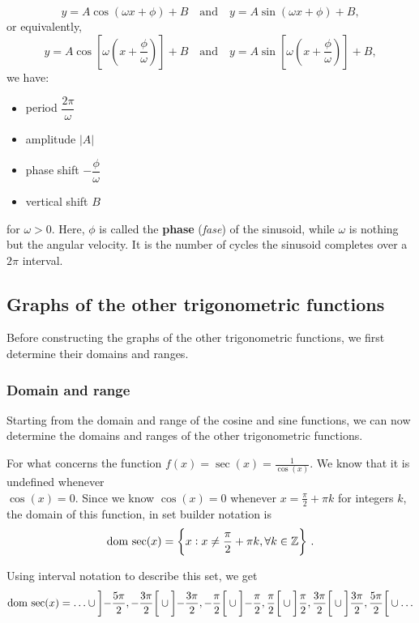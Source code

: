 \[y = A \cos(\omega x + \phi) + B \quad \text{and} \quad y= A \sin(\omega x + \phi) + B ,\]
or equivalently,
\[y = A \cos\left[\omega \left(x + \frac{\phi}{\omega}\right)\right] + B \quad \text{and} \quad y= A \sin\left[\omega \left(x + \frac{\phi}{\omega}\right)\right] + B ,\]
we have:
\begin{itemize}

\item   period $\dfrac{2\pi}{\omega}$

\item   amplitude $|A|$

\item   phase shift $-\dfrac{\phi}{\omega}$

\item   vertical shift $B$

\end{itemize}
for $\omega>0$. Here, $\phi$ is called the \textbf{phase} (\textit{fase}) of the sinusoid, while $\omega$ is nothing but the angular velocity.  It is the number of cycles the sinusoid completes over a $2\pi$ interval. 

\fi


\subsection{Graphs of the other trigonometric functions}

Before constructing the graphs of the other trigonometric functions, we first determine their domains and ranges. 

\subsubsection{Domain and range}
Starting from the domain and range of the cosine and sine functions, we can now determine the domains and ranges of the other trigonometric functions. 

For what concerns the function $f(x) = \sec(x) = \frac{1}{\cos(x)}$.  We know that it is undefined whenever \\ $\cos(x) = 0$.  Since we know $\cos(x) = 0$ whenever $x = \frac{\pi}{2} + \pi k$ for integers $k$, the domain of this function, in set builder notation is  
$$\text{dom}{\,}\sec(x)=\left\{ x : x \neq  \frac{\pi}{2} + \pi k, \forall k \in\mathbb{Z} \right\}\,.$$

Using interval notation to describe this set, we get  
\[\text{dom}{\,}
\sec(x) = \ldots \cup \left] -\frac{5\pi}{2}, -\frac{3\pi}{2}\right[ \cup \left] -\frac{3\pi}{2}, -\frac{\pi}{2}\right[ \cup  \left]-\frac{\pi}{2}, \frac{\pi}{2}\right[ \cup \left]\frac{\pi}{2}, \frac{3\pi}{2}\right[ \cup  \left]\frac{3\pi}{2}, \frac{5\pi}{2}\right[ \cup \ldots \]

